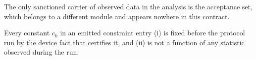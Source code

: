
The only sanctioned carrier of observed data in the analysis is the
acceptance set, which belongs to a different module and appears nowhere in
this contract.

\begin{assumption}\label{ass:constdecl}
Every constant $c_k$ in an emitted constraint entry
(i) is fixed before the protocol run by the device fact that certifies it,
and
(ii) is not a function of any statistic observed during the run.
\end{assumption}
